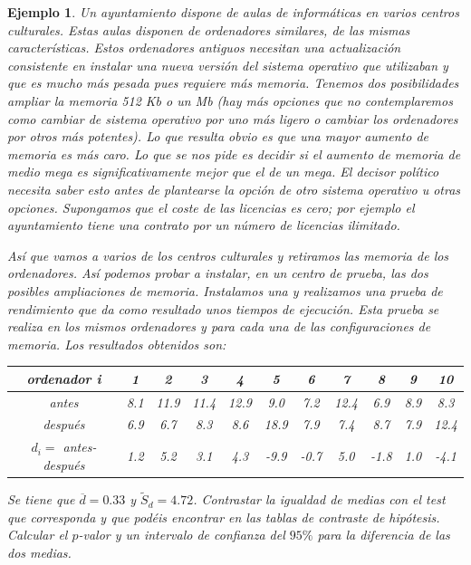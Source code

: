 \documentclass[12pt]{report}
\newtheorem{example}[definition]{Ejemplo}
\begin{document}
\begin{example} Un ayuntamiento dispone de aulas de informáticas en varios centros culturales. Estas aulas disponen  de ordenadores similares, de las mismas características. Estos ordenadores antiguos  necesitan una actualización consistente en  instalar una nueva versión del sistema operativo que utilizaban y que es mucho más \textsl{pesada} pues  requiere más memoria. Tenemos dos  posibilidades ampliar la memoria 512 Kb o un Mb (hay más opciones que no contemplaremos como cambiar de sistema operativo por uno más ligero o cambiar los ordenadores por otros más potentes). Lo que resulta obvio es que una mayor aumento de memoria es más caro. Lo que se nos pide es decidir  si el aumento de memoria de medio mega es significativamente mejor que el de un mega. El decisor político necesita saber esto  antes de plantearse la opción de otro sistema operativo u otras opciones. Supongamos que el coste de las licencias es cero; por ejemplo el ayuntamiento tiene una contrato por un número de licencias ilimitado.

Así que  vamos a varios de los centros culturales y retiramos las memoria de los ordenadores. Así podemos probar a instalar, en  un centro de prueba, las dos posibles ampliaciones de memoria. Instalamos una y realizamos una prueba de rendimiento que da como resultado unos tiempos de ejecución. Esta prueba se realiza en los mismos ordenadores y para cada una de las configuraciones de memoria. Los resultados obtenidos son:


\begin{center}

\begin{tabular}{c|cccccccccc}
ordenador i & 1 & 2 & 3 & 4 & 5 & 6 & 7 & 8 & 9 & 10\\
\hline
antes &  8.1 & 11.9 &  11.4 & 12.9 &  9.0 &  7.2 &  12.4 &  6.9 &  8.9 &  8.3\\
\hline
después & 6.9  &  6.7 &  8.3 &  8.6  &  18.9 &  7.9 &  7.4 &  8.7 &  7.9 &  12.4\\
\hline
$d_i=$ antes-después &  1.2  & 5.2  & 3.1  & 4.3 & -9.9 & -0.7 &  5.0 & -1.8 &  1.0 & -4.1
\end{tabular}


\end{center}

Se tiene que $\overline{d}=0.33$ y $\tilde{S}_d=4.72$. Contrastar la igualdad de medias con el test que corresponda y que podéis encontrar en las tablas de contraste de hipótesis. Calcular el $p$-valor y un intervalo de confianza del $95\%$ para la diferencia de las dos medias.


\end{example}
\end{document}
